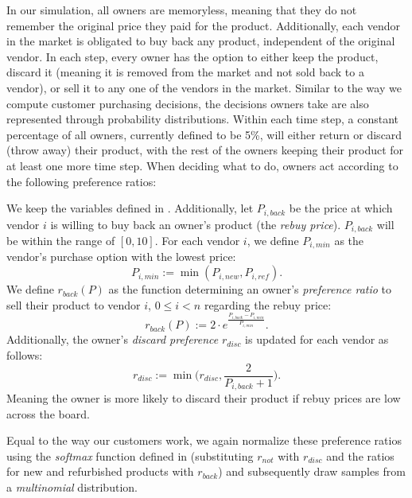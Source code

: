 In our simulation, all owners are memoryless, meaning that they do not remember the original price they paid for the product. Additionally, each vendor in the market is obligated to buy back any product, independent of the original vendor. In each step, every owner has the option to either keep the product, discard it (meaning it is removed from the market and not sold back to a vendor), or sell it to any one of the vendors in the market. Similar to the way we compute customer purchasing decisions, the decisions owners take are also represented through probability distributions. Within each time step, a constant percentage of all owners, currently defined to be 5\%, will either return or discard (throw away) their product, with the rest of the owners keeping their product for at least one more time step. When deciding what to do, owners act according to the following preference ratios:

\begin{definition}\label{def:ownerDecisions}
	We keep the variables defined in . Additionally, let \(P_{i,back}\) be the price at which vendor \(i\) is willing to buy back an owner's product (the \emph{rebuy price}). \(P_{i, back}\) will be within the range of \([0,10]\). For each vendor \(i\), we define \(P_{i,min}\) as the vendor's purchase option with the lowest price:
	\begin{equation}
		P_{i, min} := \min(P_{i, new}, P_{i, ref}).
	\end{equation}
	We define \(r_{back}(P)\) as the function determining an owner's \emph{preference ratio} to sell their product to vendor \(i\), \(0 \leq i < n\) regarding the rebuy price:
	\begin{equation}
		r_{back}(P) := 2 \cdot e^{\frac{P_{i, back} - P_{i, min}}{P_{i, min}}}.
	\end{equation}
	Additionally, the owner's \emph{discard preference} \(r_{disc}\) is updated for each vendor as follows:
	\begin{equation}
		r_{disc} := \min\biggl({r_{disc}, \frac{2}{P_{i, back} + 1}}\biggr).
	\end{equation}
	Meaning the owner is more likely to discard their product if rebuy prices are low across the board.
\end{definition}

Equal to the way our customers work, we again normalize these preference ratios using the \emph{softmax} function defined in  (substituting \(r_{not}\) with \(r_{disc}\) and the ratios for new and refurbished products with \(r_{back}\)) and subsequently draw samples from a \emph{multinomial} distribution.

